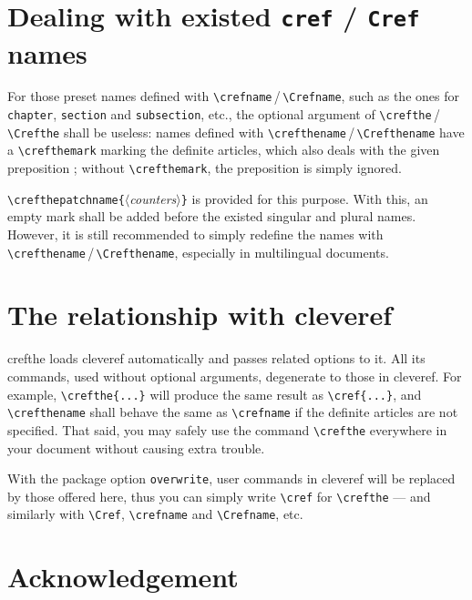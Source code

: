\documentclass[classical]{einfart}
\newcommand{\meta}[1]{$\langle${\normalfont\itshape#1}$\rangle$}
\newcommand{\packageoption}[1]{\texttt{\textcolor{code-option}{#1}}}
\newcommand{\crefthepackage}{\textsf{crefthe}}
\begin{document}
\section{Dealing with existed \texttt{cref} / \texttt{Cref} names}

For those preset names defined with \lstinline|\crefname|\,/\,\lstinline|\Crefname|, such as the ones for \texttt{chapter}, \texttt{section} and \texttt{subsection}, etc., the optional argument of \lstinline|\crefthe|\,/\,\lstinline|\Crefthe| shall be useless: names defined with \lstinline|\crefthename|\,/\,\lstinline|\Crefthename| have a \lstinline|\crefthemark| marking the definite articles, which also deals with the given preposition ; without \lstinline|\crefthemark|, the preposition is simply ignored.

\lstinline|\crefthepatchname{|\meta{counters}\lstinline|}| is provided for this purpose. With this, an empty mark shall be added before the existed singular and plural names. However, it is still recommended to simply redefine the names with \lstinline|\crefthename|\,/\,\lstinline|\Crefthename|, especially in multilingual documents.



\section{The relationship with \textsf{cleveref}}

\crefthepackage{} loads \textsf{cleveref} automatically and passes related options to it. All its commands, used without optional arguments, degenerate to those in \textsf{cleveref}. For example, \lstinline|\crefthe{...}|%
will produce the same result as \lstinline|\cref{...}|, and \lstinline|\crefthename| shall behave the same as \lstinline|\crefname| if the definite articles are not specified. That said, you may safely use the command \lstinline|\crefthe| everywhere in your document without causing extra trouble.

With the package option \packageoption{overwrite}, user commands in \textsf{cleveref} will be replaced by those offered here, thus you can simply write \lstinline|\cref| for \lstinline|\crefthe| --- and similarly with \lstinline|\Cref|, \lstinline|\crefname| and \lstinline|\Crefname|, etc.


\clearpage


\section{Acknowledgement}
\end{document}
